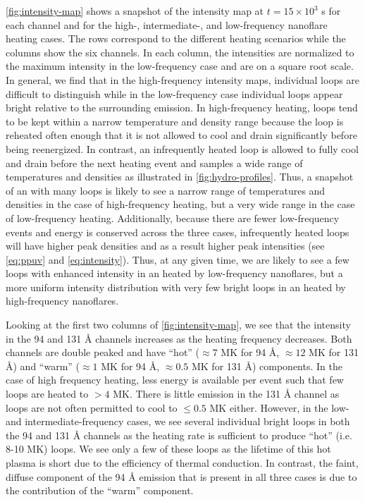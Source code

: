 \autoref{fig:intensity-map} shows a snapshot of the intensity map at $t=15\times10^3$ s for each channel and for the high-, intermediate-, and low-frequency nanoflare heating cases. The rows correspond to the different heating scenarios while the columns show the six channels. In each column, the intensities are normalized to the maximum intensity in the low-frequency case and are on a square root scale. In general, we find that in the high-frequency intensity maps, individual loops are difficult to distinguish while in the low-frequency case individual loops appear bright relative to the surrounding emission. In high-frequency heating, loops tend to be kept within a narrow temperature and density range because the loop is reheated often enough that it is not allowed to cool and drain significantly before being reenergized. In contrast, an infrequently heated loop is allowed to fully cool and drain before the next heating event and samples a wide range of temperatures and densities as illustrated in \autoref{fig:hydro-profiles}. Thus, a snapshot of an \AR{} with many loops is likely to see a narrow range of temperatures and densities in the case of high-frequency heating, but a very wide range in the case of low-frequency heating. Additionally, because there are fewer low-frequency events and energy is conserved across the three cases, infrequently heated loops will have higher peak densities and as a result higher peak intensities (see \autoref{eq:ppuv} and \ref{eq:intensity}). Thus, at any given time, we are likely to see a few loops with enhanced intensity in an \AR{} heated by low-frequency nanoflares, but a more uniform intensity distribution with very few bright loops in an \AR{} heated by high-frequency nanoflares.

Looking at the first two columns of \autoref{fig:intensity-map}, we see that the intensity in the 94 and 131 \AA{} channels increases as the heating frequency decreases. Both channels are double peaked and have ``hot'' ($\approx7$ MK for 94 \AA{}, $\approx12$ MK for 131 \AA{}) and ``warm'' ($\approx1$ MK for 94 \AA{}, $\approx0.5$ MK for 131 \AA{}) components. In the case of high frequency heating, less energy is available per event such that few loops are heated to $>4$ MK. There is little emission in the 131 \AA{} channel as loops are not often permitted to cool to $\leq0.5$ MK either. However, in the low- and intermediate-frequency cases, we see several individual bright loops in both the 94 and 131 \AA{} channels as the heating rate is sufficient to produce ``hot'' (i.e. 8-10 MK) loops. We see only a few of these loops as the lifetime of this hot plasma is short due to the efficiency of thermal conduction. In contrast, the faint, diffuse component of the 94 \AA{} emission that is present in all three cases is due to the contribution of the ``warm'' component. 

